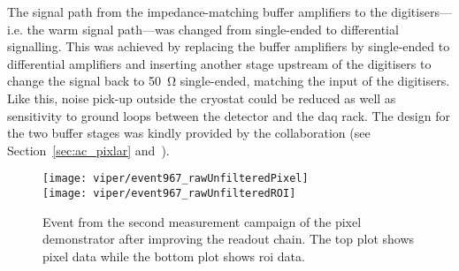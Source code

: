 The signal path from the impedance-matching buffer amplifiers to the digitisers---i.e. the warm signal path---was changed from single-ended to differential signalling.
This was achieved by replacing the buffer amplifiers by single-ended to differential amplifiers and inserting another stage upstream of the digitisers to change the signal back to \SI{50}{\ohm} single-ended, matching the input of the digitisers.
Like this, noise pick-up outside the cryostat could be reduced as well as sensitivity to ground loops between the detector and the \gls{daq} rack.
The design for the two buffer stages was kindly provided by the \lariat{} collaboration (see Section~\ref{sec:ac_pixlar} and~\cite{lariat}).

\begin{figure}[htb]
	\centering
	\texttt{[image: viper/event967\_rawUnfilteredPixel]}\\
	\texttt{[image: viper/event967\_rawUnfilteredROI]}
	\caption[Event from second pixel demonstrator measurement campaign]{%
		Event from the second measurement campaign of the pixel demonstrator after improving the readout chain.
		The top plot shows pixel data while the bottom plot shows \acrshort{roi} data.
	}
	\label{fig:electronics_event-run2}
\end{figure}

